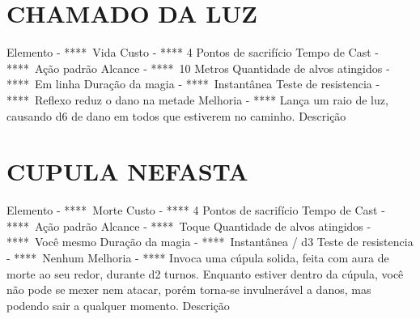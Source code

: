 \documentclass{article}%
\begin{document}
%
\section{CHAMADO DA LUZ}%
\label{sec:CHAMADODALUZ}%
Elemento {-} ****~Vida\newline%
Custo {-} **** 4 Pontos de sacrifício\newline%
Tempo de Cast {-} ****~Ação padrão\newline%
Alcance {-} ****~10 Metros\newline%
Quantidade de alvos atingidos {-} ****~Em linha\newline%
Duração da magia {-} ****~Instantânea\newline%
Teste de resistencia {-} ****~Reflexo reduz o dano na metade\newline%
Melhoria {-} **** Lança um raio de luz, causando d6 de dano em todos que estiverem no caminho.\newline%
Descrição \newline%

%
\section{CUPULA NEFASTA}%
\label{sec:CUPULANEFASTA}%
Elemento {-} ****~Morte\newline%
Custo {-} **** 4 Pontos de sacrifício\newline%
Tempo de Cast {-} ****~Ação padrão\newline%
Alcance {-} ****~Toque\newline%
Quantidade de alvos atingidos {-} ****~Você mesmo\newline%
Duração da magia {-} ****~Instantânea / d3\newline%
Teste de resistencia {-} ****~Nenhum\newline%
Melhoria {-} **** Invoca uma cúpula solida, feita com aura de morte ao seu redor, durante d2 turnos. Enquanto estiver dentro da cúpula, você não pode se mexer nem atacar, porém torna{-}se invulnerável a danos, mas podendo sair a qualquer momento.\newline%
Descrição \newline%

%
\end{document}
